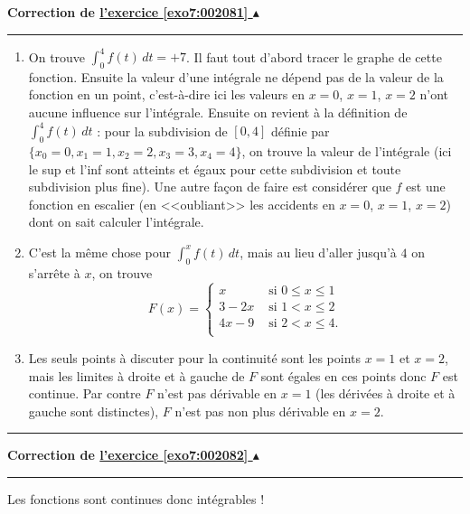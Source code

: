 \documentclass[11pt,a4paper]{article}
\newcounter{exo}
\newcommand{\correction}[1]{\hypertarget{cor7:#1}{}\label{cor7:#1}{\bf Correction de \hyperlink{exo7:#1}{l'exercice \ref{exo7:#1} $\blacktriangle$}}\vspace{1mm}\hrule\vspace{1mm}}
\newcommand{\fincorrection}{\vspace{1mm}\hrule\vspace*{7mm}}
\begin{document}
\correction{002081}
  \begin{enumerate}
  \item On trouve $\int_0^4 f(t) \, dt = +7$. Il faut tout d'abord tracer le graphe de cette fonction. 
Ensuite la valeur d'une intégrale ne dépend pas de la valeur de la fonction en un point, 
c'est-à-dire ici les valeurs en $x=0$, $x=1$, $x=2$ n'ont aucune influence sur l'intégrale. 
Ensuite on revient à la définition de $\int_0^4f(t) \, dt$ : pour la subdivision de $[0,4]$
 définie par $\{x_0=0,x_1=1,x_2=2,x_3=3, x_4=4\}$, on trouve la valeur de l'intégrale (ici le sup et l'inf 
sont atteints et égaux pour cette subdivision et toute subdivision plus fine).
Une autre façon de faire est considérer que $f$ est une fonction en escalier (en <<oubliant>> les accidents en
$x=0$, $x=1$, $x=2$) dont on sait calculer l'intégrale.
  \item C'est la même chose pour $\int_0^x  f(t) \, dt$, mais au lieu d'aller jusqu'à $4$ on s'arrête à $x$, on trouve
\begin{equation*}
  F(x)=
  \begin{cases}
   x &\text{ si $0\leqslant x \leqslant 1$}\\
   3-2x &\text{ si $1<x\leqslant 2$}\\
   4x-9 &\text{ si $2 < x \leqslant 4$.}\\
  \end{cases}
\end{equation*}

  \item Les seuls points à discuter pour la continuité sont les points $x=1$ et $x=2$,
mais les limites à droite et à gauche de $F$ sont égales en ces points donc $F$ est continue. 
Par contre $F$ n'est pas dérivable en $x=1$ (les dérivées à droite et à gauche 
sont distinctes), $F$ n'est pas non plus dérivable en $x=2$.

  \end{enumerate}
\fincorrection
\correction{002082}
Les fonctions sont continues donc intégrables !
\end{document}
